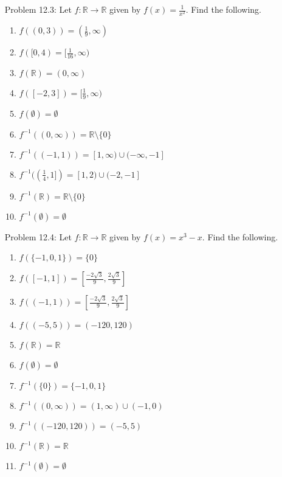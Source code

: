 \documentclass{article}
\theoremstyle{claim}
\theoremstyle{definition}
\begin{document}
\begin{enumerate}
\begin{proof}
\begin{itemize}
            \end{itemize}
        \end{proof}
    \item[Problem 12.3:] Let $f: \mathbb{R} \rightarrow \mathbb{R}$ given by $f(x) = \frac{1}{x^2}$. Find the following.
        \begin{enumerate}
            \item $f((0, 3)) = (\frac{1}{9}, \infty)$
            \item $f([0, 4) = [\frac{1}{16}, \infty)$
            \item $f(\mathbb{R}) = (0, \infty)$
            \item $f([-2, 3]) = [\frac{1}{9}, \infty)$
            \item $f(\emptyset) = \emptyset$
            \item $f^{-1}((0, \infty)) = \mathbb{R} \setminus \{ 0 \}$
            \item $f^{-1}((-1, 1)) = [1, \infty) \cup (-\infty, -1]$
            \item $f^{-1}((\frac{1}{4}, 1]) = [1, 2) \cup (-2, -1]$
            \item $f^{-1}(\mathbb{R}) = \mathbb{R} \setminus \{ 0 \}$
            \item $f^{-1}(\emptyset) = \emptyset$
        \end{enumerate}
    \item[Problem 12.4:] Let $f: \mathbb{R} \rightarrow \mathbb{R}$ given by $f(x) = x^3 - x$. Find the following.
        \begin{enumerate}
            \item $f(\{-1, 0, 1\}) = \{ 0 \}$
            \item $f([-1, 1]) = [\frac{-2\sqrt{3}}{9}, \frac{2\sqrt{3}}{9}]$
            \item $f((-1, 1)) = [\frac{-2\sqrt{3}}{9}, \frac{2\sqrt{3}}{9}]$
            \item $f((-5, 5)) = (-120, 120)$
            \item $f(\mathbb{R}) = \mathbb{R}$
            \item $f(\emptyset) = \emptyset$
            \item $f^{-1}(\{ 0 \}) = \{-1, 0 , 1\}$
            \item $f^{-1}((0, \infty)) = (1, \infty) \cup (-1, 0)$
            \item $f^{-1}((-120, 120)) = (-5, 5)$
            \item $f^{-1}(\mathbb{R}) = \mathbb{R}$
            \item $f^{-1}(\emptyset) = \emptyset$
        \end{enumerate}
\end{enumerate}
\end{document}
